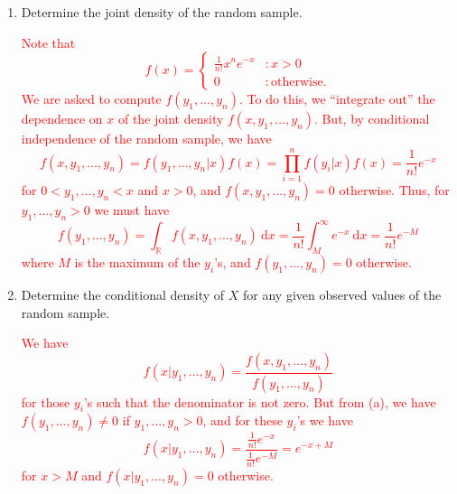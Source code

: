 \documentclass[12pt,reqno]{amsart}
\begin{document}
\medskip
\begin{enumerate}
\item Determine the joint density of the random sample.

\bigskip
\textcolor{red}{Note that
	\[
	f(x) = \begin{cases}
	\frac{1}{n!} x^n e^{-x} & : x>0\\
	0 & : \text{otherwise}.
	\end{cases}
	\]
We are asked to compute $f(y_1,\ldots,y_n)$. To do this, we ``integrate out'' the dependence on $x$ of the joint density $f(x,y_1,\ldots,y_n)$. But, by conditional independence of the random sample, we have
	\[
	f(x,y_1,\ldots,y_n) = f(y_1,\ldots,y_n|x)f(x) = \prod_{i=1}^n f(y_i|x)f(x) = \frac{1}{n! } e^{-x}
	\]
for $0<y_1,\ldots,y_n<x$ and $x>0$, and $f(x,y_1,\ldots,y_n)=0$ otherwise. Thus, for $y_1,\ldots,y_n>0$ we must have
	\[
	f(y_1,\ldots,y_n) = \int_{\mathbb{R}} f(x,y_1,\ldots,y_n)  \ \text{d}x = \frac{1}{n!} \int_{M}^\infty e^{-x} \ \text{d}x = \frac{1}{n!}e^{-M}
	\]
where $M$ is the maximum of the $y_i$'s, and $f(y_1,\ldots,y_n)=0$ otherwise.}
\bigskip

\item Determine the conditional density of $X$ for any given observed values of the random sample.

\bigskip
\textcolor{red}{We have
	\[
	f(x|y_1,\ldots,y_n) = \frac{f(x,y_1,\ldots,y_n)}{f(y_1,\ldots,y_n)}
	\]
for those $y_i$'s such that the denominator is not zero. But from (a), we have $f(y_1,\ldots,y_n)\neq 0$ if $y_1,\ldots,y_n>0$, and for these $y_i$'s we have
	\[
	f(x|y_1,\ldots,y_n) = \frac{\frac{1}{n!}e^{-x}}{\frac{1}{n!}e^{-M}} = e^{-x+M}
	\]
for $x>M$ and $f(x|y_1,\ldots,y_n)=0$ otherwise.}
\end{enumerate}
\end{document}
